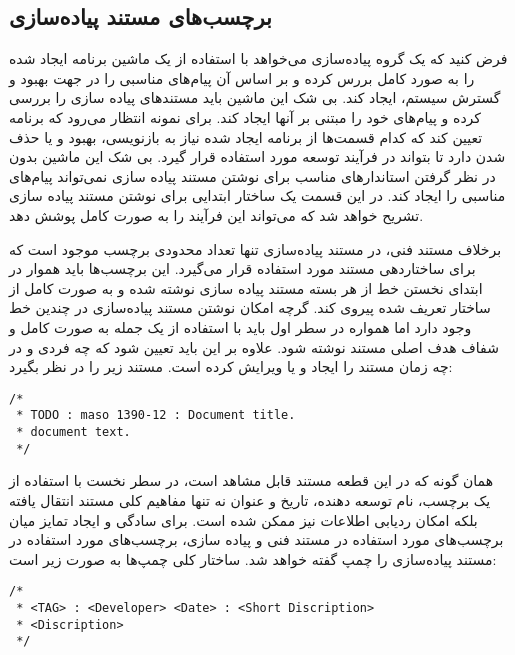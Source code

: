 \subsection{برچسب‌های مستند پیاده‌سازی}
فرض کنید که یک گروه پیاده‌سازی می‌خواهد با استفاده از یک ماشین برنامه ایجاد شده را به صورد کامل
بررس کرده و بر اساس آن پیام‌های مناسبی را در جهت بهبود و گسترش سیستم، ایجاد کند. بی شک این ماشین
باید مستندهای پیاده سازی را بررسی کرده و پیام‌های خود را مبتنی بر آنها ایجاد کند. برای نمونه انتظار
می‌رود که برنامه تعیین کند که کدام قسمت‌ها از برنامه ایجاد شده نیاز به بازنویسی، بهبود و یا حذف شدن 
دارد تا بتواند در فرآیند توسعه مورد استفاده قرار گیرد. بی شک این ماشین بدون در نظر گرفتن استاندارهای
مناسب برای نوشتن مستند پیاده سازی نمی‌تواند پیام‌های مناسبی را ایجاد کند. در این قسمت یک ساختار ابتدایی
برای نوشتن مستند پیاده سازی تشریح خواهد شد که می‌تواند این فرآیند را به صورت کامل پوشش دهد.

برخلاف مستند فنی، در مستند پیاده‌سازی تنها تعداد محدودی برچسب موجود است که برای ساختاردهی مستند مورد
استفاده قرار می‌گیرد. این برچسب‌ها باید هموار در ابتدای نخستن خط از هر بسته مستند پیاده سازی نوشته
شده و به صورت کامل از ساختار تعریف شده پیروی کند. گرچه امکان نوشتن مستند پیاده‌سازی در چندین خط وجود
دارد اما همواره در سطر اول باید با استفاده از یک جمله به صورت کامل و شفاف هدف اصلی مستند نوشته شود.
علاوه بر این باید تعیین شود که چه فردی و در چه زمان مستند را ایجاد و یا ویرایش کرده است. مستند زیر
را در نظر بگیرد:


\begin{latin}
\lstset{language=C++}
\begin{lstlisting}[frame=single] 
/*
 * TODO : maso 1390-12 : Document title.
 * document text.
 */
\end{lstlisting}
\end{latin}

همان گونه که در این قطعه مستند قابل مشاهد است، در سطر نخست با استفاده از یک برچسب، نام توسعه دهنده، 
تاریخ و عنوان نه تنها مفاهیم کلی مستند انتقال یافته بلکه امکان ردیابی اطلاعات نیز ممکن شده است. 
برای سادگی و ایجاد تمایز میان برچسب‌های مورد استفاده در مستند فنی و پیاده سازی، برچسب‌های مورد استفاده
در مستند پیاده‌سازی را چمپ 
 گفته خواهد شد. ساختار کلی چمپ‌ها به صورت زیر است:


\begin{latin}
\lstset{language=C++}
\begin{lstlisting}[frame=single] 
/*
 * <TAG> : <Developer> <Date> : <Short Discription>
 * <Discription>
 */
\end{lstlisting}
\end{latin}

